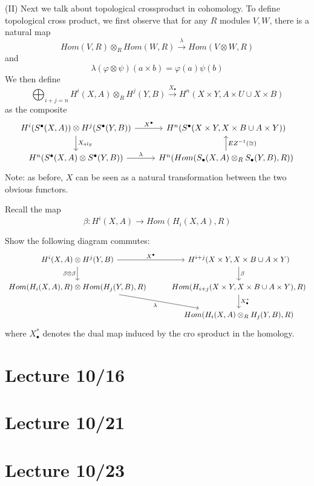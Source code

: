 (II) Next we talk about topological crossproduct in cohomology. To define topological cross product, we first observe that for any $R$ modules $V,W$, there is a natural map 
\begin{equation*}
    Hom(V,R)\otimes_R Hom(W,R)\xrightarrow{\lambda} Hom(V\otimes W,R)
\end{equation*}
and 
\begin{equation*}
    \lambda(\varphi\otimes\psi)(a\times b)=\varphi(a)\psi(b)
\end{equation*}
We then define 
\begin{equation*}
    \bigoplus_{i+j=n}H^i(X,A)\otimes_R H^j(Y,B)\xrightarrow{X_\bullet}H^n(X\times Y, A\times U\cup X\times B)
\end{equation*}
as the composite
\[\begin{tikzcd}
	{H^i(S^\bullet(X,A))\otimes H^j(S^\bullet(Y,B))} & {H^n(S^\bullet(X\times Y, X\times B\cup A\times Y))} \\
	{H^n(S^\bullet(X,A)\otimes S^\bullet(Y,B))} & {H^n(Hom(S_\bullet(X,A)\otimes_R S_\bullet(Y,B),R))}
	\arrow["{X^\bullet}", from=1-1, to=1-2]
	\arrow["{X_{alg}}", from=1-1, to=2-1]
	\arrow["\lambda", from=2-1, to=2-2]
	\arrow["{EZ^{-1} (\cong)}"', from=2-2, to=1-2]
\end{tikzcd}\]
Note: as before, $X$ can be seen as a natural transformation between the two obvious functors.

Recall the map 
\begin{equation*}
    \beta: H^i(X,A)\to Hom(H_i(X,A),R)
\end{equation*}
\begin{prob}[HW(3.6)]
    Show the following diagram commutes:
    \[\begin{tikzcd}
        {H^i(X,A)\otimes H^j(Y,B)} & {H^{i+j}(X\times Y, X\times B\cup A\times Y)} \\
        {Hom(H_i(X,A),R)\otimes Hom(H_j(Y,B),R)} & {Hom(H_{i+j}(X\times Y, X\times B\cup A\times Y),R)} \\
        & {Hom(H_i(X,A)\otimes_R H_j(Y,B),R)}
        \arrow["{X^\bullet}", from=1-1, to=1-2]
        \arrow["{\beta\otimes\beta}"', from=1-1, to=2-1]
        \arrow["\beta", from=1-2, to=2-2]
        \arrow["\lambda"', from=2-1, to=3-2]
        \arrow["{X_\bullet^*}", from=2-2, to=3-2]
    \end{tikzcd}\]
    where $X_\bullet^*$ denotes the dual map induced by the cro
    sproduct in the homology.
\end{prob}


\section{Lecture 10/16}



\section{Lecture 10/21}



\section{Lecture 10/23}